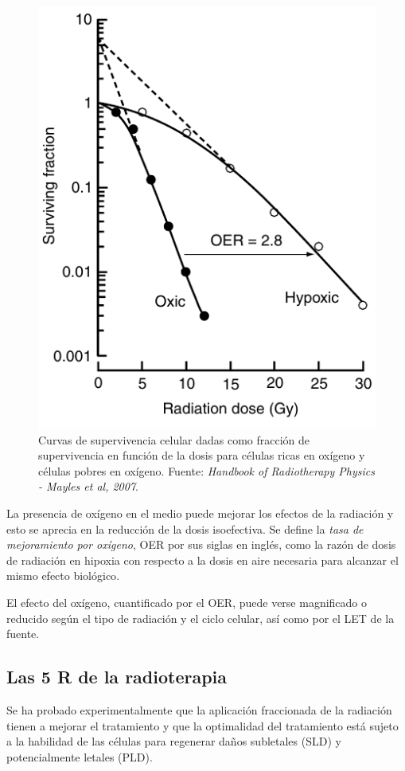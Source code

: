 \documentclass[12pt,letterpaper, oneside]{book}
\begin{document}
			\begin{figure}[h!]
				\centering
				\includegraphics[scale=0.50]{imagenes/oxic_hypoxic_sc_Mayles2007.png}
				\caption{Curvas de supervivencia celular dadas como fracción de supervivencia en función de la dosis para células ricas en oxígeno y células pobres en oxígeno. Fuente: \textit{Handbook of Radiotherapy Physics - Mayles et al, 2007}.}\label{oxic_hypoxic_sc_Mayles2007}
			\end{figure}  
		
		La presencia de oxígeno en el medio puede mejorar los efectos de la radiación y esto se aprecia en la reducción de la dosis isoefectiva\cite{Mayles.2007}. Se define la \textit{tasa de mejoramiento por oxígeno}, OER por sus siglas en inglés, como la razón de dosis de radiación en hipoxia con respecto a la dosis en aire necesaria para alcanzar el mismo efecto biológico\cite{Mayles.2007, Smith.2000}. 
		
		El efecto del oxígeno, cuantificado por el OER, puede verse magnificado o reducido según el tipo de radiación y el ciclo celular, así como por el LET de la fuente\cite{Hall.2000}. 
		
		\subsection{Las 5 R de la radioterapia}
			Se ha probado experimentalmente que la aplicación fraccionada de la radiación tienen a mejorar el tratamiento\cite{Mayles.2007} y que la optimalidad del tratamiento está sujeto a la habilidad de las células para regenerar daños subletales (SLD) y potencialmente letales (PLD)\cite{Bleehen.2007}. 
			
\end{document}
